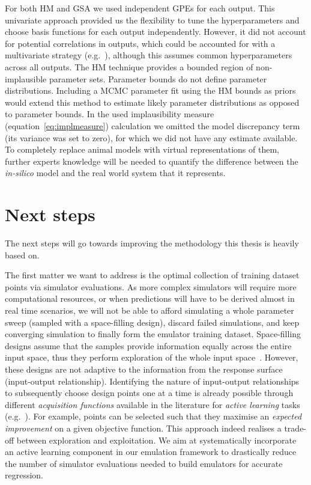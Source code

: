 \vspace{0.2cm}
For both HM and GSA we used independent GPEs for each output. This univariate approach provided us the flexibility to tune the hyperparameters and choose basis functions for each output independently. However, it did not account for potential correlations in outputs, which could be accounted for with a multivariate strategy (e.g.~\cite{Conti:2009}), although this assumes common hyperparameters across all outputs. The HM technique provides a bounded region of non-implausible parameter sets. Parameter bounds do not define parameter distributions. Including a MCMC parameter fit using the HM bounds as priors would extend this method to estimate likely parameter distributions as opposed to parameter bounds. In the used implausibility measure (equation~\eqref{eq:implmeasure}) calculation we omitted the model discrepancy term (its variance was set to zero), for which we did not have any estimate available. To completely replace animal models with virtual representations of them, further experts knowledge will be needed to quantify the difference between the \textit{in-silico} model and the real world system that it represents.


%
%
%
\section{Next steps}\label{sec:ch9next_steps}
The next steps will go towards improving the methodology this thesis is heavily based on.

\vspace{0.2cm}
The first matter we want to address is the optimal collection of training dataset points via simulator evaluations. As more complex simulators will require more computational resources, or when predictions will have to be derived almost in real time scenarios, we will not be able to afford simulating a whole parameter sweep (sampled with a space-filling design), discard failed simulations, and keep converging simulation to finally form the emulator training dataset. Space-filling designs assume that the samples provide information equally across the entire input space, thus they perform exploration of the whole input space~\cite{Yue:2021}. However, these designs are not adaptive to the information from the response surface (input-output relationship). Identifying the nature of input-output relationships to subsequently choose design points one at a time is already possible through different \textit{acquisition functions} available in the literature for \textit{active learning} tasks (e.g.~\cite{Jones:1998,Pasolli:2011,Schreiter:2015}). For example, points can be selected such that they maximise an \textit{expected improvement} on a given objective function. This approach indeed realises a trade-off between exploration and exploitation. We aim at systematically incorporate an active learning component in our emulation framework to drastically reduce the number of simulator evaluations needed to build emulators for accurate regression.

